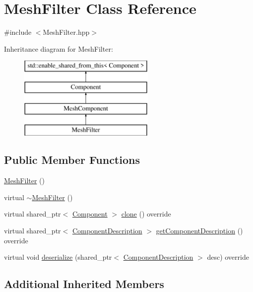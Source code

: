 \hypertarget{class_mesh_filter}{}\section{Mesh\+Filter Class Reference}
\label{class_mesh_filter}


{\ttfamily \#include $<$Mesh\+Filter.\+hpp$>$}

Inheritance diagram for Mesh\+Filter\+:\begin{figure}[H]
\begin{center}
\leavevmode
\includegraphics[height=4.000000cm]{class_mesh_filter}
\end{center}
\end{figure}
\subsection*{Public Member Functions}
\begin{DoxyCompactItemize}
\item 
\hyperlink{class_mesh_filter_aad0010eab8429ee8a574f6c1d57126e6}{Mesh\+Filter} ()
\item 
virtual \hyperlink{class_mesh_filter_a8ffe38518dd8010150201f70789048b4}{$\sim$\+Mesh\+Filter} ()
\item 
virtual shared\+\_\+ptr$<$ \hyperlink{class_component}{Component} $>$ \hyperlink{class_mesh_filter_a6645cf7989fad04e40096955296b96a2}{clone} () override
\item 
virtual shared\+\_\+ptr$<$ \hyperlink{class_component_description}{Component\+Description} $>$ \hyperlink{group__serialization__functions_ga3f175929ed6c3d53b330eca5de9c5a13}{get\+Component\+Description} () override
\item 
virtual void \hyperlink{group__serialization__functions_gae0449262f3398c229e95911f69930acb}{deserialize} (shared\+\_\+ptr$<$ \hyperlink{class_component_description}{Component\+Description} $>$ desc) override
\end{DoxyCompactItemize}
\subsection*{Additional Inherited Members}


